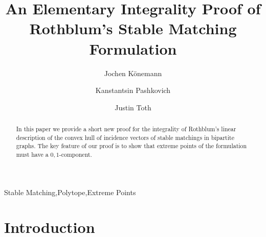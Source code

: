 \documentclass[3p,times]{elsarticle}
\begin{document}
\begin{frontmatter}



\title{An Elementary Integrality
  Proof of Rothblum's Stable Matching Formulation}
\author[co]{Jochen K\"{o}nemann}
\author[co]{Kanstantsin Pashkovich}
\author[co]{Justin Toth}
\address[co]{Department of Combinatorics and Optimization, University of Waterloo, Canada}


\begin{abstract}
  In this paper we provide a short new proof for the integrality of
  Rothblum's linear description of the convex hull of incidence
  vectors of stable matchings in bipartite graphs. The key feature of our proof is to show
  that extreme points of the formulation must have a $0,1$-component. 
\end{abstract}
\begin{keyword}
Stable Matching\sep Polytope\sep Extreme Points
\end{keyword}
\end{frontmatter}

\section{Introduction}
\end{document}
